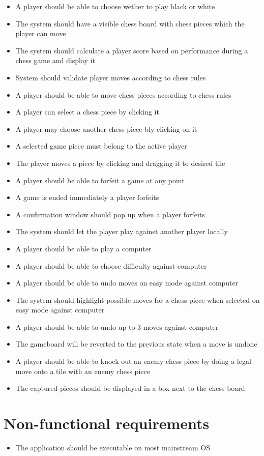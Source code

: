\documentclass[letterpaper,11pt]{article}
\begin{document}
\begin{itemize}
	\item A player should be able to choose wether to play black or white
	\item The system should have a visible chess board with chess pieces which the player can move
	\item The system should calculate a player score based on performance during a chess game and display it
	\item System should validate player moves according to chess rules
	\item A player should be able to move chess pieces according to chess rules
	\item A player can select a chess piece by clicking it
	\item A player may choose another chess piece bly clicking on it
	\item A selected game piece must belong to the active player
	\item The player moves a piece by clicking and dragging it to desired tile
	\item A player should be able to forfeit a game at any point
	\item A game is ended immediately a player forfeits
	\item A confirmation window should pop up when a player forfeits
	\item The system should let the player play against another player locally
	\item A player should be able to play a computer
	\item A player should be able to choose difficulty against computer
	\item A player should be able to undo moves on easy mode against computer
	\item The system should highlight possible moves for a chess piece when selected on easy mode against computer
	\item A player should be able to undo up to 3 moves against computer
	\item The gameboard will be reverted to the previous state when a move is undone
	\item A player should be able to knock out an enemy chess piece by doing a legal move onto a tile with an enemy chess piece
	\item The captured pieces should be displayed in a box next to the chess board
\end{itemize}

\section*{Non-functional requirements}
\begin{itemize}
	\item The application should be executable on most mainstream OS
\end{itemize}
\end{document}
